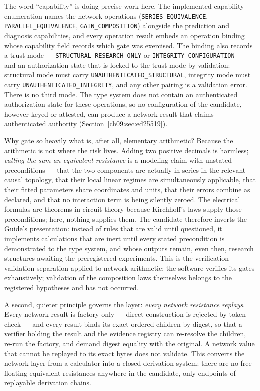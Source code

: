 The word ``capability'' is doing precise work here. The implemented
capability enumeration names the network operations
(\texttt{SERIES\_EQUIVALENCE}, \texttt{PARALLEL\_EQUIVALENCE},
\texttt{GAIN\_COMPOSITION}) alongside the prediction and diagnosis
capabilities, and every operation result embeds an operation binding whose
capability field records which gate was exercised. The binding also records
a trust mode --- \texttt{STRUCTURAL\_RESEARCH\_ONLY} or
\texttt{INTEGRITY\_CONFIGURATION} --- and an authorization state that is
locked to the trust mode by validation: structural mode must carry
\texttt{UNAUTHENTICATED\_STRUCTURAL}, integrity mode must carry
\texttt{UNAUTHENTICATED\_INTEGRITY}, and any other pairing is a validation
error. There is no third mode. The type system does not contain an
authenticated authorization state for these operations, so no configuration
of the candidate, however keyed or attested, can produce a network result
that claims authenticated authority (Section~\ref{ch09:sec:ed25519}).

Why gate so heavily what is, after all, elementary arithmetic? Because the
arithmetic is not where the risk lives. Adding two positive decimals is
harmless; \emph{calling the sum an equivalent resistance} is a modeling
claim with unstated preconditions --- that the two components are actually
in series in the relevant causal topology, that their local linear regimes
are simultaneously applicable, that their fitted parameters share
coordinates and units, that their errors combine as declared, and that no
interaction term is being silently zeroed. The electrical formulas are
theorems in circuit theory because Kirchhoff's laws supply those
preconditions; here, nothing supplies them. The candidate therefore inverts
the Guide's presentation: instead of rules that are valid until questioned,
it implements calculations that are inert until every stated precondition
is demonstrated to the type system, and whose outputs remain, even then,
research structures awaiting the preregistered experiments. This is the
verification-validation separation \cite{sargent} applied to network
arithmetic: the software verifies its gates exhaustively; validation of the
composition laws themselves belongs to the registered hypotheses and has
not occurred.

A second, quieter principle governs the layer: \emph{every network
resistance replays}.
Every network result is factory-only --- direct construction is rejected by
token check --- and every result binds its exact ordered children by digest,
so that a verifier holding the result and the evidence registry can
re-resolve the children, re-run the factory, and demand digest equality
with the original. A network value that cannot be replayed to its exact
bytes does not validate. This converts the network layer from a calculator
into a closed derivation system: there are no free-floating equivalent
resistances anywhere in the candidate, only endpoints of replayable
derivation chains.

